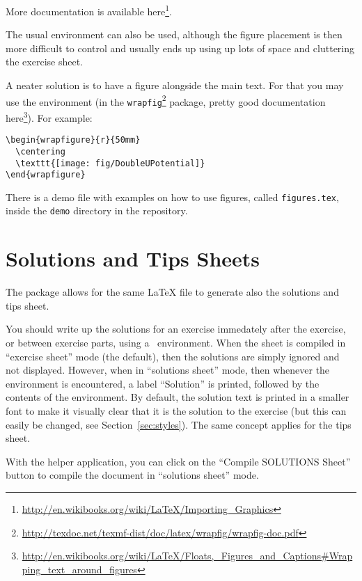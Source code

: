 \documentclass[11pt,a4paper]{article}
\begin{document}
More documentation is available
here\footnote{\url{http://en.wikibooks.org/wiki/LaTeX/Importing_Graphics}}.

The usual  environment can also be used, although the figure placement is
then more difficult to control and usually ends up using up lots of space and cluttering
the exercise sheet.

A neater solution is to have a figure alongside the main text. For that you may use the
 environment (in the
\texttt{wrapfig}\footnote{\url{http://texdoc.net/texmf-dist/doc/latex/wrapfig/wrapfig-doc.pdf}}
package, pretty good documentation
here\footnote{\url{http://en.wikibooks.org/wiki/LaTeX/Floats,_Figures_and_Captions\#Wrapping_text_around_figures}}).
For example:
\begin{pkgverbatim}
\begin{verbatim}
\begin{wrapfigure}{r}{50mm}
  \centering
  \texttt{[image: fig/DoubleUPotential]}
\end{wrapfigure}
\end{verbatim}
\end{pkgverbatim}

There is a demo file with examples on how to use figures, called \verb|figures.tex|,
inside the \verb|demo| directory in the \ethuebung{} repository.


\section{Solutions and Tips Sheets}
\label{sec:Solutions}

The package \ethuebung{} allows for the same \LaTeX{} file to generate also the solutions
and tips sheet.

You should write up the solutions for an exercise immedately after the exercise, or
between exercise parts, using a~ environment. When the sheet is compiled
in ``exercise sheet'' mode (the default), then the solutions are simply ignored and not
displayed. However, when in ``solutions sheet'' mode, then whenever the environment
 is encountered, a label ``Solution'' is printed, followed by the
contents of the environment. By default, the solution text is printed in a smaller font to
make it visually clear that it is the solution to the exercise (but this can easily be
changed, see Section~\ref{sec:styles}). The same concept applies for the tips sheet.

With the helper application, you can click on the ``Compile SOLUTIONS Sheet'' button to
compile the document in ``solutions sheet'' mode.
\end{document}
